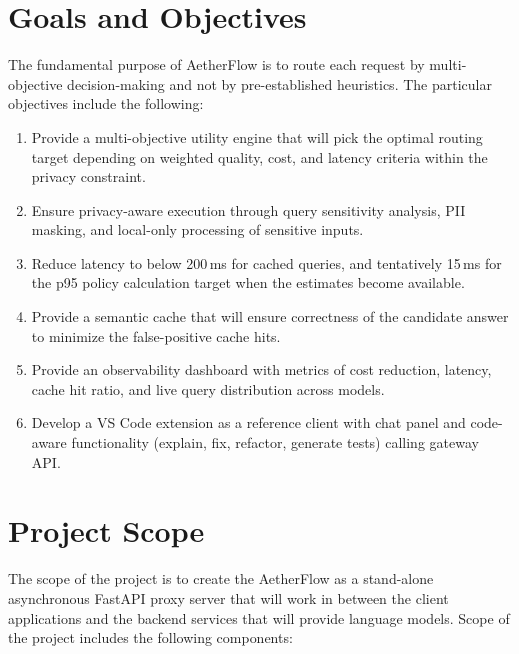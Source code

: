 \documentclass{FastFyp}
\begin{document}
\section{Goals and Objectives}
\label{sec:goals}

The fundamental purpose of AetherFlow is to route each request by multi-objective decision-making and not by pre-established heuristics. The particular objectives include the following:

\begin{enumerate}
    \item Provide a multi-objective utility engine that will pick the optimal routing target depending on weighted quality, cost, and latency criteria within the privacy constraint.
    \item Ensure privacy-aware execution through query sensitivity analysis, PII masking, and local-only processing of sensitive inputs.
    \item Reduce latency to below 200\,ms for cached queries, and tentatively 15\,ms for the p95 policy calculation target when the estimates become available.
    \item Provide a semantic cache that will ensure correctness of the candidate answer to minimize the false-positive cache hits.
    \item Provide an observability dashboard with metrics of cost reduction, latency, cache hit ratio, and live query distribution across models.
    \item Develop a VS Code extension as a reference client with chat panel and code-aware functionality (explain, fix, refactor, generate tests) calling gateway API.
\end{enumerate}

\section{Project Scope}
\label{sec:scope}


The scope of the project is to create the AetherFlow as a stand-alone asynchronous FastAPI proxy server that will work in between the client applications and the backend services that will provide language models. Scope of the project includes the following components:
\end{document}
